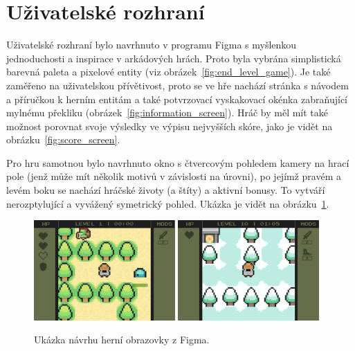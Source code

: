 \section{Uživatelské rozhraní}
Uživatelské rozhraní bylo navrhnuto v programu Figma s myšlenkou jednoduchosti a inspirace v arkádových hrách. Proto byla vybrána simplistická barevná paleta a pixelové entity (viz obrázek~\ref{fig:end_level_game}). Je také zaměřeno na uživatelskou přívětivost, proto se ve hře nachází stránka s návodem a příručkou k herním entitám a také potvrzovací vyskakovací okénka zabraňující mylnému překliku (obrázek~\ref{fig:information_screen}). Hráč by měl mít také možnost porovnat svoje výsledky ve výpisu nejvyšších skóre, jako je vidět na obrázku~\ref{fig:score_screen}.

Pro hru samotnou bylo navrhnuto okno s čtvercovým pohledem kamery na hrací pole (jenž může mít několik motivů v závislosti na úrovni), po jejímž pravém a levém boku se nachází hráčské životy (a štíty) a aktivní bonusy. To vytváří nerozptylující a vyvážený symetrický pohled. Ukázka je vidět na obrázku~\ref{fig:game_screen}.

\begin{figure}[hb]
    \centering
    \includegraphics[width=0.48\textwidth]{obrazky-figures/ch3/game_screen.png}\hspace{0.1cm}
    \includegraphics[width=0.48\textwidth]{obrazky-figures/ch3/Game_screen-WINTER_BLOCK.png}
    \caption{Ukázka návrhu herní obrazovky z Figma.}
    \label{fig:game_screen}
\end{figure}

